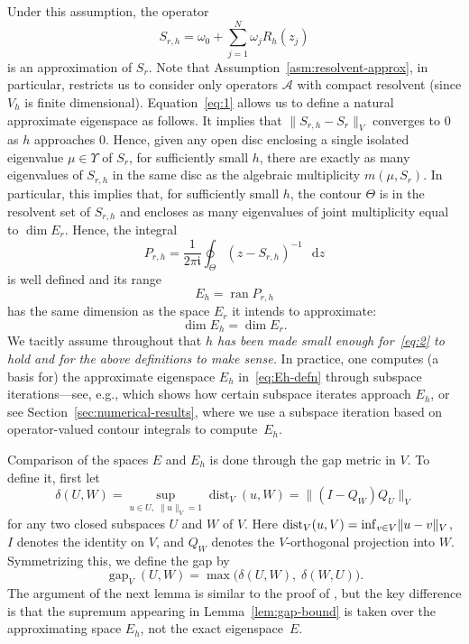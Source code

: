 \documentclass[12pt, oneside, reqno]{amsart}
\theoremstyle{remark}
\newcommand{\ii}{\mathfrak{i}}
\newcommand{\diff}{\mathop{}\!\mathrm{d}}
\DeclareMathOperator{\ran}{ran}
\DeclareMathOperator{\dist}{dist}
\DeclareMathOperator{\gap}{gap}
\DeclarePairedDelimiter{\norm}{\lVert}{\rVert}
\newcommand{\nquad}{N}
\newcommand{\vT}{\varTheta}
\newcommand{\vU}{\varUpsilon}
\newcommand{\dz}{\diff{z}}
\newcommand{\Srh}{S_{r, h}}
\newcommand{\Prh}{P_{r, h}}
\newcommand{\Ac}{\mathcal{A}}
\newcommand{\og}{\omega}
\begin{document}
Under this assumption, the operator   
\begin{equation}
  \label{eq:Srh-defn}
  \Srh = \og_0 + \sum_{j=1}^\nquad \omega_j R_h(z_j)
\end{equation}
is an approximation of $S_r$. Note that
Assumption~\ref{asm:resolvent-approx}, in particular, restricts us to
consider only operators $\Ac$ with compact resolvent (since $V_h$ is
finite dimensional).  Equation~\eqref{eq:1} allows us to define a
natural approximate eigenspace as follows. It 
implies that $\|\Srh - S_r\|_V$ converges to
$0$ as $h$ approaches $0$. Hence, given any open disc enclosing a single 
isolated eigenvalue $\mu \in \vU$ of $S_r$, for sufficiently small
$h$, there are exactly as many eigenvalues of $\Srh$ in the same disc
as the algebraic multiplicity $m(\mu, S_r).$ In particular, this
implies that, for sufficiently small $h$, the contour $\vT$ is in the
resolvent set of $\Srh$ and encloses as many eigenvalues of joint
multiplicity equal to $\dim E_r.$ Hence, the integral
\[
  \Prh  = \frac{1}{ 2 \pi \ii} 
  \oint_\Theta \left(z - \Srh \right)^{-1} \,\dz
\]
is well defined and its range 
\begin{equation}
  \label{eq:Eh-defn}
    E_h = \ran \Prh 
\end{equation}
has the same dimension as the space $E_r$ it intends to approximate: 
\begin{equation}
  \label{eq:2}
  \dim E_h = \dim E_r.
\end{equation}
We tacitly assume throughout that {\em $h$ has been made small enough
for~\eqref{eq:2} to hold and for the above definitions to make sense.}
In practice, one computes (a basis for) the approximate eigenspace $E_h$
in~\eqref{eq:Eh-defn} through subspace iterations---see, e.g., \cite[Theorem~3.4]{GopGruOva2020-1} which shows how certain subspace iterates approach $E_h$,
or see 
Section~\ref{sec:numerical-results}, where we use 
a subspace iteration based on operator-valued contour integrals to compute~$E_h$.

Comparison of the spaces $E$ and $E_h$ is done through the gap metric in $V$. To
define it, first let
\[
  \delta(U, W) =
  \sup_{u \in U,\; \|u \|_V=1 } \dist_V(u, W)  = \| (I - Q_W) Q_U \|_V
\]
for any two closed subspaces \(U\) and \(W\) of $V$. Here
\(\dist_V(u, V) = \inf_{v \in V} \norm{u - v}_V\),
$I$ denotes the identity on $V$,
and $Q_W$ denotes the $V$-orthogonal projection into $W$.
Symmetrizing this, we define the gap by
\[
  \gap_V(U, W) 
  = \max \Big( \delta(U, W), \;\delta(W, U) \Big).
\]
The argument of the next lemma is similar to the proof of
\cite[Theorem~4.1]{GopGruOva2020-1}, but the key difference is that
the supremum appearing in Lemma~\ref{lem:gap-bound} is taken over the
approximating space $E_h$, not the exact eigenspace~$E$.
\end{document}
